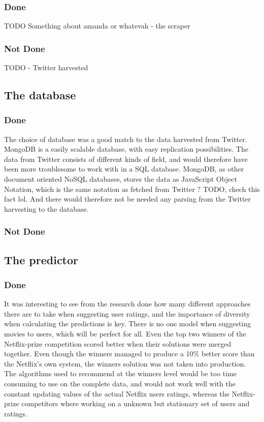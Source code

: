 \subsubsection{Done}
TODO Something about amanda or whatevah - the scraper
\subsubsection{Not Done}
TODO - Twitter harvested

\subsection{The database}
\subsubsection{Done}
The choice of database was a good match to the data harvested from Twitter. MongoDB is a easily scalable database, with easy replication possibilities. The data from Twitter consists of different kinds of field, and would therefore have been more troublesome to work with in a SQL database. MongoDB, as other document oriented NoSQL databases, stores the data as JavaScript Object Notation, which is the same notation as fetched from Twitter ? TODO, chech this fact lol. And there would therefore not be needed any parsing from the Twitter harvesting to the database.

\subsubsection{Not Done}

\subsection{The predictor}
\subsubsection{Done}
It was interesting to see from the research done how many different approaches there are to take when suggesting user ratings, and the importance of diversity when calculating the predictions is key. There is no one model when suggesting movies to users, which will be perfect for all. Even the top two winners of the Netflix-prize competition scored better when their solutions were merged together. Even though the winners managed to produce a 10\% better score than the Netflix's own system, the winners solution was not taken into production. The algorithms used to recommend at the winners level would be too time consuming to use on the complete data, and would not work well with the constant updating values of the actual Netflix users ratings, whereas the Netflix-prize competitors where working on a unknown but stationary set of users and ratings.

